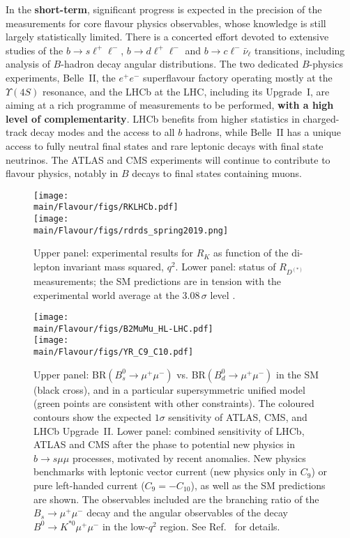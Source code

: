 In the {\bf short-term}, significant progress is expected in the precision of the measurements for core flavour physics observables, whose knowledge is still largely statistically limited. There is a concerted effort devoted to extensive studies of the $b\rightarrow s \ell^+\ell^-$, $b\rightarrow d \ell^+\ell^-$ and $b \rightarrow c \ell^- \bar\nu_\ell$ transitions, including analysis of $B$-hadron decay angular distributions. 
%
The two dedicated $B$-physics experiments, Belle~II, the $e^+e^-$ superflavour factory 
operating mostly at the $\Upsilon(4S)$ resonance, and the LHCb at the LHC, including its Upgrade~I,
are aiming at a rich programme of measurements to be performed, {\bf with a high level of complementarity}.  LHCb benefits from higher statistics in charged-track decay modes and the access to all $b$ hadrons, while Belle~II has a unique access to fully neutral final states and rare leptonic decays with final state neutrinos. 
The ATLAS and CMS experiments 
will continue to contribute to flavour physics, notably in $B$ decays to final states containing muons.
\begin{figure}[t]
  \centering  
  \texttt{[image: \\main/Flavour/figs/RKLHCb.pdf]}\hbox{\hspace{-0.2cm}}\\
  \texttt{[image: \\main/Flavour/figs/rdrds\_spring2019.png]}\hbox{\hspace{-0.2cm}} 
  \caption{Upper panel: experimental results for 
  $R_K$ as function of the di-lepton invariant mass squared, $q^2$. Lower panel: status of $R_{D^{(*)}}$
  measurements; the SM predictions are  
   in tension with the experimental world average at 
  the 3.08\,$\sigma$ level \cite{HFLAVSPRING19}.}
  \label{fig:RKRD}
\end{figure}

\begin{figure}[t]
\centering
\texttt{[image: \\main/Flavour/figs/B2MuMu\_HL-LHC.pdf]}\\
\texttt{[image: \\main/Flavour/figs/YR\_C9\_C10.pdf]}
\caption{ 
Upper panel: BR$(B_s^0 \to \mu^+\mu^-)$ vs. BR$(B_d^0 \to \mu^+\mu^-)$ in the SM (black cross), and in a particular supersymmetric unified model (green points are consistent with other constraints). The coloured contours show the expected $1\sigma$ \HLLHC sensitivity of ATLAS, CMS, and LHCb Upgrade~II. Lower panel: combined sensitivity of LHCb, ATLAS and CMS after the \HLLHC phase to potential new physics in $b\to s\mu\mu$ processes, motivated by recent anomalies. New physics benchmarks with leptonic vector current (new physics only in $C_9$) or pure left-handed current ($C_9=-C_{10}$), as well as the SM predictions are shown. The observables included are the branching ratio  of the $B_s\to\mu^+\mu^-$ decay and the angular observables of the decay $B^0 \to K^{\ast 0} \mu^+\mu^-$ in the low-$q^2$ region.
See  Ref.~\cite{Cerri:2018ypt} for details.}
\label{fig:Bmumu} 
\end{figure} 

